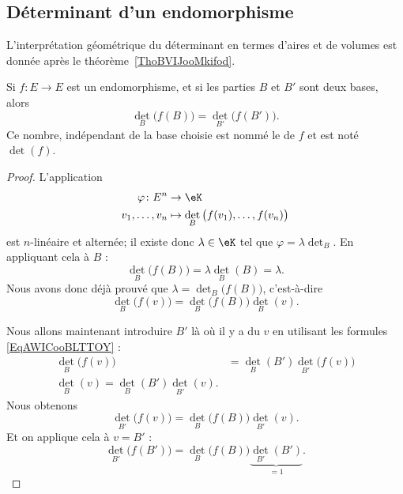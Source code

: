 \subsection{Déterminant d'un endomorphisme}

L'interprétation géométrique du déterminant en termes d'aires et de volumes est donnée après le théorème~\ref{ThoBVIJooMkifod}.

\begin{lemmaDef}       \label{LEMooQTRVooAKzucd}      \label{DefCOZEooGhRfxA}
	Si \( f\colon E\to E\) est un endomorphisme, et si les parties \( B\) et \( B'\) sont deux bases, alors
	\begin{equation}
		\det_B\big( f(B) \big)=\det_{B'}\big( f(B') \big).
	\end{equation}
	Ce nombre, indépendant de la base choisie est nommé le  de \( f\) et est noté \( \det(f)\).
\end{lemmaDef}

\begin{proof}
	L'application
	\begin{equation}
		\begin{aligned}
			\varphi\colon E^n & \to \eK                                         \\
			v_1,\ldots, v_n   & \mapsto \det_B\big( f(v_1),\ldots, f(v_n) \big)
		\end{aligned}
	\end{equation}
	est \( n\)-linéaire et alternée; il existe donc \( \lambda\in \eK\) tel que \( \varphi=\lambda\det_B\). En appliquant cela à \( B\) :
	\begin{equation}
		\det_B\big( f(B) \big)=\lambda \det_B(B)=\lambda.
	\end{equation}
	Nous avons donc déjà prouvé que \( \lambda=\det_B\big( f(B) \big)\), c'est-à-dire
	\begin{equation}
		\det_B\big( f(v) \big)=\det_B\big( f(B) \big)\det_B(v).
	\end{equation}

	Nous allons maintenant introduire \( B'\) là où il y a du \( v\) en utilisant les formules \eqref{EqAWICooBLTTOY} :
	\begin{subequations}
		\begin{align}
			\det_B\big( f(v) \big) & =\det_B(B')\det_{B'}\big( f(v) \big) \\
			\det_B(v)=\det_B(B')\det_{B'}(v).
		\end{align}
	\end{subequations}
	Nous obtenons
	\begin{equation}
		\det_{B'}\big( f(v) \big)=\det_B\big( f(B) \big)\det_{B'}(v).
	\end{equation}
	Et on applique cela à \( v=B'\) :
	\begin{equation}
		\det_{B'}\big( f(B') \big)=\det_B\big( f(B) \big)\underbrace{\det_{B'}(B')}_{=1}.
	\end{equation}
\end{proof}

